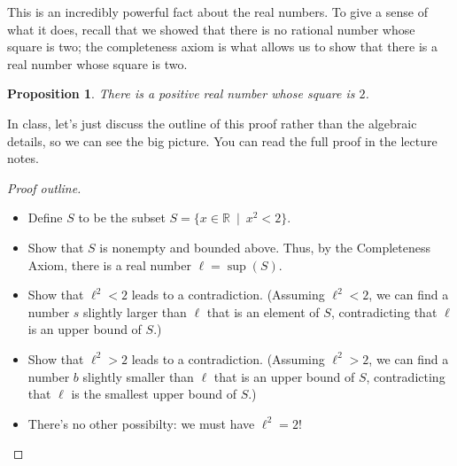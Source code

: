 \documentclass[12pt]{amsart}
\newcommand{\R}{{\mathbb{R}}}
\numberwithin{equation}{section}
\theoremstyle{plain} %
\newtheorem{prop}[equation]{Proposition}
\theoremstyle{definition}
\theoremstyle{remark}
\begin{document}
This is an incredibly powerful fact about the real numbers. To give a sense of what it does, recall that we showed that there is no rational number whose square is two; the completeness axiom is what allows us to show that there is a real number whose square is two.


\begin{prop} \label{prop116} There is a positive real number whose square is $2$.
\end{prop}

In class, let's just discuss the outline of this proof rather than the algebraic details, so we can see the big picture. You can read the full proof in the lecture notes.

\begin{proof}[Proof outline] \
\begin{itemize}
\item[Step 1:] Define $S$ to be the subset $S = \{x \in \R  \ \mid \  x^2 < 2\}$.
\item[Step 2:] Show that $S$ is nonempty and bounded above. Thus, by the Completeness Axiom, there is a real number $\ell = \sup(S)$.
\item[Step 3:] Show that $\ell^2 < 2$ leads to a contradiction. (Assuming $\ell^2<2$, we can find a number $s$ slightly larger than $\ell$ that is an element of $S$, contradicting that $\ell$ is an upper bound of $S$.)
\item[Step 4:] Show that $\ell^2 > 2$ leads to a contradiction. (Assuming $\ell^2>2$, we can find a number $b$ slightly smaller than $\ell$ that is an upper bound of $S$, contradicting that $\ell$ is the smallest upper bound of $S$.)
\item [Step 5:] There's no other possibilty: we must have $\ell^2=2$! \qedhere
\end{itemize}
\end{proof}
\end{document}
